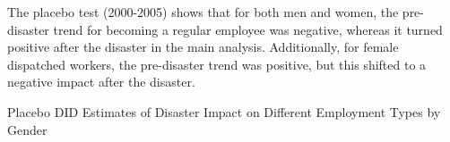 \documentclass[serif, aspectratio=169]{beamer}
\newcommand{\returnbutton}[2]{%
  \vspace{-1.0cm}  %
  \hfill  %
  \hyperlink{#1}{%
    {\footnotesize\beamerbutton{#2}}%
  }%
  \vspace{0.3cm}  %
}
\begin{document}

\begin{frame}[label=different_types_placebo]

The placebo test (2000-2005) shows that for both men and women, the pre-disaster trend for becoming a regular employee was negative, whereas it turned positive after the disaster in the main analysis. Additionally, for female dispatched workers, the pre-disaster trend was positive, but this shifted to a negative impact after the disaster. 

\vspace{-1.5cm}
\returnbutton{different_types}{Return}
\vspace{2.6cm}

\begin{table}[htbp]
\centering
\caption{Placebo DID Estimates of Disaster Impact on Different Employment Types by Gender}

\vspace{-0.2cm}


\end{table}
\end{frame}
\end{document}
